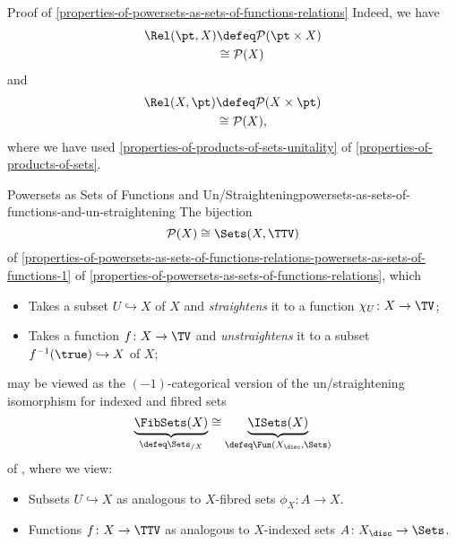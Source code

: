 \begin{Proof}{Proof of \cref{properties-of-powersets-as-sets-of-functions-relations}}
    Indeed, we have
    \begin{align*}
        \Rel(\pt,X) &\defeq \mathcal{P}(\pt\times X)\\
                    &\cong  \mathcal{P}(X)
    \end{align*}
    and
    \begin{align*}
        \Rel(X,\pt) &\defeq \mathcal{P}(X\times\pt)\\
                    &\cong  \mathcal{P}(X),
    \end{align*}
    where we have used \cref{properties-of-products-of-sets-unitality} of  \cref{properties-of-products-of-sets}.
\end{Proof}
\begin{remark}{Powersets as Sets of Functions and Un/Straightening}{powersets-as-sets-of-functions-and-un-straightening}%
    The bijection
    \[
        \mathcal{P}(X)%
        \cong%
        \Sets(X,\TTV)%
    \]%
    of \cref{properties-of-powersets-as-sets-of-functions-relations-powersets-as-sets-of-functions-1} of \cref{properties-of-powersets-as-sets-of-functions-relations}, which
    \begin{itemize}
        \item Takes a subset $U\hookrightarrow X$ of $X$ and \emph{straightens} it to a function $\chi_{U}\colon X\to\TV$;
        \item Takes a function $f\colon X\to\TV$ and \emph{unstraightens} it to a subset $f^{-1}(\true)\hookrightarrow X$ of $X$;
    \end{itemize}
    may be viewed as the $(-1)$-categorical version of the un/straightening isomorphism for indexed and fibred sets
    \[
        \underbrace{\FibSets(X)}_{\defeq\Sets_{/X}}%
        \cong%
        \underbrace{\ISets(X)}_{\defeq\Fun(X_{\disc},\Sets)}%
    \]%
    of , where we view:
    \begin{itemize}
        \item Subsets $U\hookrightarrow X$ as analogous to $X$-fibred sets $\phi_{X}\colon A\to X$.
        \item Functions $f\colon X\to\TTV$ as analogous to $X$-indexed sets $A\colon X_{\disc}\to\Sets$.
    \end{itemize}
\end{remark}
